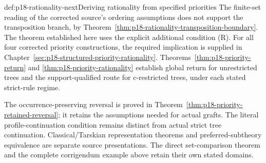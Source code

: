 \begin{proofboundary}{def:p18-rationality-next}{Deriving rationality from specified priorities}
The finite-set reading of the corrected source's ordering assumptions
does not support the transposition branch, by
Theorem~\ref{thm:p18-rationality-transposition-boundary}.
The theorem established here uses the explicit additional condition (R).
For all four corrected priority constructions, the required implication
is supplied in Chapter~\ref{sec:p18-structured-priority-rationality}.
Theorems~\ref{thm:p18-priority-return} and
\ref{thm:p18-priority-rationality} establish global return for
unrestricted trees and the support-qualified route for c-restricted
trees, under each stated strict-rule regime.

The occurrence-preserving reversal is proved in
Theorem~\ref{thm:p18-priority-retained-reversal}; it retains the
assumptions needed for actual grafts. The literal profile-continuation
condition remains distinct from actual strict tree continuation.
Classical/Tarskian representation theorems and preferred-subtheory
equivalence are separate source presentations. The direct set-comparison
theorem and the complete corrigendum example above retain their own
stated domains.
\end{proofboundary}
